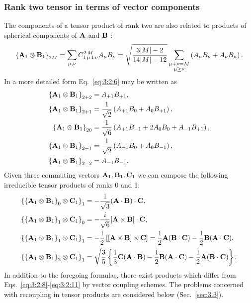 \subsubsection{Rank two tensor in terms of vector components}
The components of a tensor product of rank two are also related to products of spherical components of $\mathbf{A}$ and $\mathbf{B}$ :
\begin{equation}
\left\{\mathbf{A}_{1} \otimes \mathbf{B}_{1}\right\}_{2 M}=\sum_{\mu, \nu} C_{1\,\mu\,1\,\nu}^{2\,M} A_{\mu} B_{\nu}=\sqrt{\frac{3|M|-2}{14|M|-12}} \sum_{\substack{\mu+\nu=M \\ \mu \geq \nu}}\left(A_{\mu} B_{\nu}+A_{\nu} B_{\mu}\right) .\label{eq:3:2:6}
\end{equation}
In a more detailed form Eq.~\eqref{eq:3:2:6} may be written as
\begin{align}
\left\{\mathbf{A}_{1} \otimes \mathbf{B}_{1}\right\}_{2+2}&=A_{+1} B_{+1},  \notag\\
\left\{\mathbf{A}_{1} \otimes \mathbf{B}_{1}\right\}_{2+1}&=\frac{1}{\sqrt{2}}\left(A_{+1} B_{0}+A_{0} B_{+1}\right),  \notag\\
\left\{\mathbf{A}_{1} \otimes \mathbf{B}_{1}\right\}_{20}&=\frac{1}{\sqrt{6}}\left(A_{+1} B_{-1}+2 A_{0} B_{0}+A_{-1} B_{+1}\right),  \label{eq:3:2:7}\\
\left\{\mathbf{A}_{1} \otimes \mathbf{B}_{1}\right\}_{2-1}&=\frac{1}{\sqrt{2}}\left(A_{-1} B_{0}+A_{0} B_{-1}\right),  \notag\\
\left\{\mathbf{A}_{1} \otimes \mathbf{B}_{1}\right\}_{2-2}&=A_{-1} B_{-1} . \notag
\end{align}
Given three commuting vectors $\mathbf{A}_{1}, \mathbf{B}_{1}, \mathbf{C}_{1}$ we can compose the following irreducible tensor products of ranks 0 and 1:
\begin{align}
\left\{\left\{\mathbf{A}_{1} \otimes \mathbf{B}_{1}\right\}_{0} \otimes \mathbf{C}_{1}\right\}_{1}&=-\frac{1}{\sqrt{3}}(\mathbf{A} \cdot \mathbf{B}) \cdot \mathbf{C},  \label{eq:3:2:8}\\
\left\{\left\{\mathbf{A}_{1} \otimes \mathbf{B}_{1}\right\}_{1} \otimes \mathbf{C}_{1}\right\}_{0}&=-\frac{i}{\sqrt{6}}[\mathbf{A} \times \mathbf{B}] \cdot \mathbf{C},  \label{eq:3:2:9}\\
\left\{\left\{\mathbf{A}_{1} \otimes \mathbf{B}_{1}\right\}_{1} \otimes \mathbf{C}_{1}\right\}_{1}&=-\frac{1}{2}\left[[ \mathbf{A} \times \mathbf{B}] \times \mathbf{C}\right]=\frac{1}{2} \mathbf{A}(\mathbf{B} \cdot \mathbf{C})-\frac{1}{2} \mathbf{B}(\mathbf{A} \cdot \mathbf{C}),  \label{eq:3:2:10}\\
\left\{\left\{\mathbf{A}_{1} \otimes \mathbf{B}_{1}\right\}_{2} \otimes \mathbf{C}_{1}\right\}_{1}&=\sqrt{\frac{3}{5}}\left\{\frac{1}{3} \mathbf{C}(\mathbf{A} \cdot \mathbf{B})-\frac{1}{2} \mathbf{B}(\mathbf{A} \cdot \mathbf{C})-\frac{1}{2} \mathbf{A}(\mathbf{B} \cdot \mathbf{C})\right\} . \label{eq:3:2:11}
\end{align}
In addition to the foregoing formulas, there exist products which differ from Eqs.~\eqref{eq:3:2:8}-\eqref{eq:3:2:11} by vector coupling schemes. The problems concerned with recoupling in tensor products are considered below (Sec.~\ref{sec:3.3}).

